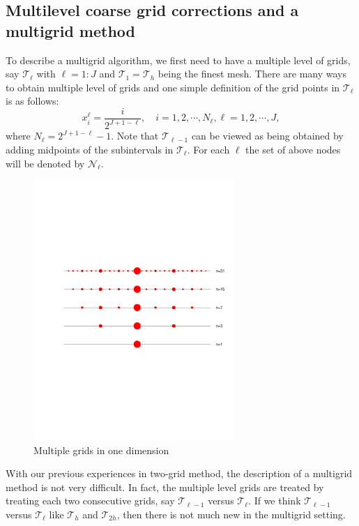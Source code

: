 \subsection{Multilevel coarse grid corrections and a multigrid method}
To describe a multigrid algorithm, we first need to have a multiple
level of grids, say $\mathcal T_\ell$ with $\ell=1:J$ and $\mathcal T_1=\mathcal T_h$ being the
finest mesh.  There are many ways to obtain multiple level of grids
and one simple definition of the grid points in $\mathcal T_\ell$ is as follows:
$$
        x_i^\ell=\frac{i}{2^{J+1-\ell}},\quad i=1,2,\cdots, N_\ell, \ell=1,2,\cdots,J,
$$
where $N_\ell=2^{J+1-\ell}-1$.  Note that $\mathcal T_{\ell-1}$ can be viewed as being obtained
by adding midpoints of the subintervals in ${\mathcal T}_{\ell}$.  For each $\ell$
the set of above nodes will be denoted by $\mathcal N_\ell$.

\begin{figure}[!htb]
\begin{center}
\includegraphics[width=3in]{pictures/manygr.pdf}
\end{center}
\caption{Multiple grids in one dimension
\label{fig:manygrids}}
\end{figure}


With our previous experiences in two-grid method, the description of a
multigrid method is not very difficult.  In fact, the multiple level
grids are treated by treating each two consecutive grids, say $\mathcal T_{\ell-1}$
versus $\mathcal T_{\ell}$.  If we think $\mathcal T_{\ell-1}$ versus $\mathcal T_{\ell}$ like
$\mathcal T_h$ and $\mathcal T_{2h}$, then there is not much new in the multigrid
setting.


